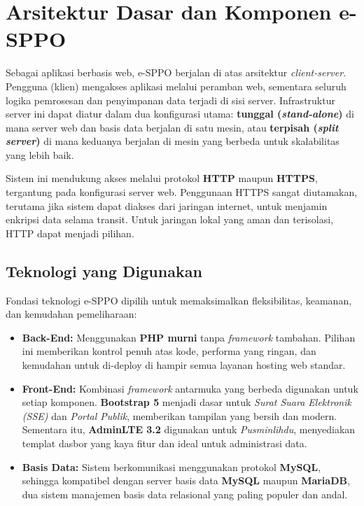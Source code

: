 \section{Arsitektur Dasar dan Komponen e-SPPO}
\label{sec:arsitektur_esppo}
Sebagai aplikasi berbasis web, e-SPPO berjalan di atas arsitektur \textit{client-server}. Pengguna (klien) mengakses aplikasi melalui peramban web, sementara seluruh logika pemrosesan dan penyimpanan data terjadi di sisi server. Infrastruktur server ini dapat diatur dalam dua konfigurasi utama: \textbf{tunggal (\textit{stand-alone})} di mana server web dan basis data berjalan di satu mesin, atau \textbf{terpisah (\textit{split server})} di mana keduanya berjalan di mesin yang berbeda untuk skalabilitas yang lebih baik.

Sistem ini mendukung akses melalui protokol \textbf{HTTP} maupun \textbf{HTTPS}, tergantung pada konfigurasi server web. Penggunaan HTTPS sangat diutamakan, terutama jika sistem dapat diakses dari jaringan internet, untuk menjamin enkripsi data selama transit. Untuk jaringan lokal yang aman dan terisolasi, HTTP dapat menjadi pilihan.

\subsection{Teknologi yang Digunakan}
Fondasi teknologi e-SPPO dipilih untuk memaksimalkan fleksibilitas, keamanan, dan kemudahan pemeliharaan:
\begin{itemize}
	\item \textbf{Back-End:} Menggunakan \textbf{PHP murni} tanpa \textit{framework} tambahan. Pilihan ini memberikan kontrol penuh atas kode, performa yang ringan, dan kemudahan untuk di-deploy di hampir semua layanan hosting web standar.
	\item \textbf{Front-End:} Kombinasi \textit{framework} antarmuka yang berbeda digunakan untuk setiap komponen. \textbf{Bootstrap 5} menjadi dasar untuk \textit{Surat Suara Elektronik (SSE)} dan \textit{Portal Publik}, memberikan tampilan yang bersih dan modern. Sementara itu, \textbf{AdminLTE 3.2} digunakan untuk \textit{Pusminlihdu}, menyediakan templat dasbor yang kaya fitur dan ideal untuk administrasi data.
	\item \textbf{Basis Data:} Sistem berkomunikasi menggunakan protokol \textbf{MySQL}, sehingga kompatibel dengan server basis data \textbf{MySQL} maupun \textbf{MariaDB}, dua sistem manajemen basis data relasional yang paling populer dan andal.
\end{itemize}

